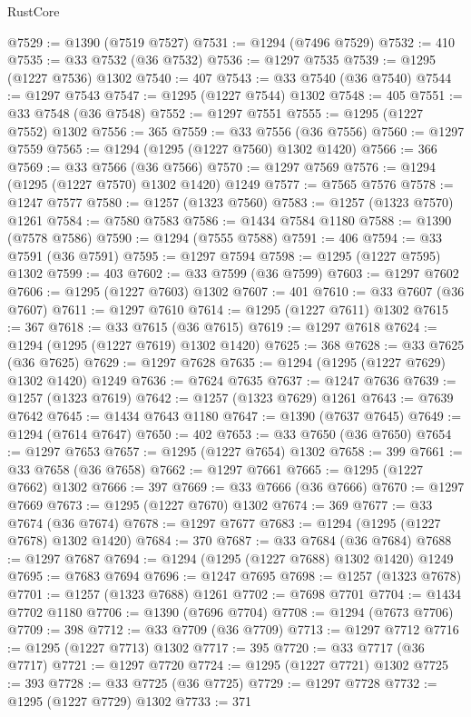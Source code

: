 \begin{lexlean}{RustCore}
\begin{coremodule}
@7529 := @1390 (@7519 @7527)
@7531 := @1294 (@7496 @7529)
@7532 := 410
@7535 := @33 @7532 (@36 @7532)
@7536 := @1297 @7535
@7539 := @1295 (@1227 @7536) @1302
@7540 := 407
@7543 := @33 @7540 (@36 @7540)
@7544 := @1297 @7543
@7547 := @1295 (@1227 @7544) @1302
@7548 := 405
@7551 := @33 @7548 (@36 @7548)
@7552 := @1297 @7551
@7555 := @1295 (@1227 @7552) @1302
@7556 := 365
@7559 := @33 @7556 (@36 @7556)
@7560 := @1297 @7559
@7565 := @1294 (@1295 (@1227 @7560) @1302 @1420)
@7566 := 366
@7569 := @33 @7566 (@36 @7566)
@7570 := @1297 @7569
@7576 := @1294 (@1295 (@1227 @7570) @1302 @1420) @1249
@7577 := @7565 @7576
@7578 := @1247 @7577
@7580 := @1257 (@1323 @7560)
@7583 := @1257 (@1323 @7570) @1261
@7584 := @7580 @7583
@7586 := @1434 @7584 @1180
@7588 := @1390 (@7578 @7586)
@7590 := @1294 (@7555 @7588)
@7591 := 406
@7594 := @33 @7591 (@36 @7591)
@7595 := @1297 @7594
@7598 := @1295 (@1227 @7595) @1302
@7599 := 403
@7602 := @33 @7599 (@36 @7599)
@7603 := @1297 @7602
@7606 := @1295 (@1227 @7603) @1302
@7607 := 401
@7610 := @33 @7607 (@36 @7607)
@7611 := @1297 @7610
@7614 := @1295 (@1227 @7611) @1302
@7615 := 367
@7618 := @33 @7615 (@36 @7615)
@7619 := @1297 @7618
@7624 := @1294 (@1295 (@1227 @7619) @1302 @1420)
@7625 := 368
@7628 := @33 @7625 (@36 @7625)
@7629 := @1297 @7628
@7635 := @1294 (@1295 (@1227 @7629) @1302 @1420) @1249
@7636 := @7624 @7635
@7637 := @1247 @7636
@7639 := @1257 (@1323 @7619)
@7642 := @1257 (@1323 @7629) @1261
@7643 := @7639 @7642
@7645 := @1434 @7643 @1180
@7647 := @1390 (@7637 @7645)
@7649 := @1294 (@7614 @7647)
@7650 := 402
@7653 := @33 @7650 (@36 @7650)
@7654 := @1297 @7653
@7657 := @1295 (@1227 @7654) @1302
@7658 := 399
@7661 := @33 @7658 (@36 @7658)
@7662 := @1297 @7661
@7665 := @1295 (@1227 @7662) @1302
@7666 := 397
@7669 := @33 @7666 (@36 @7666)
@7670 := @1297 @7669
@7673 := @1295 (@1227 @7670) @1302
@7674 := 369
@7677 := @33 @7674 (@36 @7674)
@7678 := @1297 @7677
@7683 := @1294 (@1295 (@1227 @7678) @1302 @1420)
@7684 := 370
@7687 := @33 @7684 (@36 @7684)
@7688 := @1297 @7687
@7694 := @1294 (@1295 (@1227 @7688) @1302 @1420) @1249
@7695 := @7683 @7694
@7696 := @1247 @7695
@7698 := @1257 (@1323 @7678)
@7701 := @1257 (@1323 @7688) @1261
@7702 := @7698 @7701
@7704 := @1434 @7702 @1180
@7706 := @1390 (@7696 @7704)
@7708 := @1294 (@7673 @7706)
@7709 := 398
@7712 := @33 @7709 (@36 @7709)
@7713 := @1297 @7712
@7716 := @1295 (@1227 @7713) @1302
@7717 := 395
@7720 := @33 @7717 (@36 @7717)
@7721 := @1297 @7720
@7724 := @1295 (@1227 @7721) @1302
@7725 := 393
@7728 := @33 @7725 (@36 @7725)
@7729 := @1297 @7728
@7732 := @1295 (@1227 @7729) @1302
@7733 := 371

\end{coremodule}
\end{lexlean}
